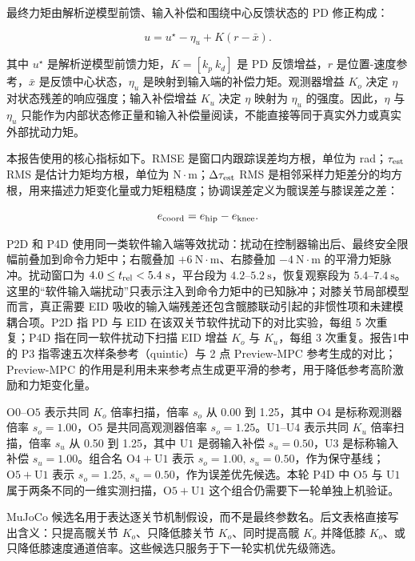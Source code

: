 最终力矩由解析逆模型前馈、输入补偿和围绕中心反馈状态的 PD 修正构成：

\[
u=u^\star-\eta_u+K(r-\bar{x}) .
\]

其中 \(u^\star\) 是解析逆模型前馈力矩，\(K=[k_p\ k_d]\) 是 PD 反馈增益，\(r\) 是位置-速度参考，\(\bar{x}\) 是反馈中心状态，\(\eta_u\) 是映射到输入端的补偿力矩。观测器增益 \(K_o\) 决定 \(\eta\) 对状态残差的响应强度；输入补偿增益 \(K_u\) 决定 \(\eta\) 映射为 \(\eta_u\) 的强度。因此，\(\eta\) 与 \(\eta_u\) 只能作为内部状态修正量和输入补偿量阅读，不能直接等同于真实外力或真实外部扰动力矩。

本报告使用的核心指标如下。RMSE 是窗口内跟踪误差均方根，单位为 rad；\(\tau_{\rm est}\) RMS 是估计力矩均方根，单位为 \(\mathrm{N\cdot m}\)；\(\Delta\tau_{\rm est}\) RMS 是相邻采样力矩差分的均方根，用来描述力矩变化量或力矩粗糙度；协调误差定义为髋误差与膝误差之差：

\[
e_{\rm coord}=e_{\rm hip}-e_{\rm knee}.
\]

P2D 和 P4D 使用同一类软件输入端等效扰动：扰动在控制器输出后、最终安全限幅前叠加到命令力矩中；右髋叠加 \(+6\ \mathrm{N\cdot m}\)、右膝叠加 \(-4\ \mathrm{N\cdot m}\) 的平滑力矩脉冲。扰动窗口为 \(4.0\le t_{\rm rel}<5.4\ \mathrm{s}\)，平台段为 \(4.2\)--\(5.2\ \mathrm{s}\)，恢复观察段为 \(5.4\)--\(7.4\ \mathrm{s}\)。这里的``软件输入端扰动''只表示注入到命令力矩中的已知脉冲；对膝关节局部模型而言，真正需要 EID 吸收的输入端残差还包含髋膝联动引起的非惯性项和未建模耦合项。P2D 指 PD 与 EID 在该双关节软件扰动下的对比实验，每组 5 次重复；P4D 指在同一软件扰动下扫描 EID 增益 \(K_o\) 与 \(K_u\)，每组 3 次重复。报告1中的 P3 指零速五次样条参考（quintic）与 2 点 Preview-MPC 参考生成的对比；Preview-MPC 的作用是利用未来参考点生成更平滑的参考，用于降低参考高阶激励和力矩变化量。

\(\mathrm{O0}\)--\(\mathrm{O5}\) 表示共同 \(K_o\) 倍率扫描，倍率 \(s_o\) 从 0.00 到 1.25，其中 \(\mathrm{O4}\) 是标称观测器倍率 \(s_o=1.00\)，\(\mathrm{O5}\) 是共同高观测器倍率 \(s_o=1.25\)。\(\mathrm{U1}\)--\(\mathrm{U4}\) 表示共同 \(K_u\) 倍率扫描，倍率 \(s_u\) 从 0.50 到 1.25，其中 \(\mathrm{U1}\) 是弱输入补偿 \(s_u=0.50\)，\(\mathrm{U3}\) 是标称输入补偿 \(s_u=1.00\)。组合名 \(\mathrm{O4+U1}\) 表示 \(s_o=1.00,\,s_u=0.50\)，作为保守基线；\(\mathrm{O5+U1}\) 表示 \(s_o=1.25,\,s_u=0.50\)，作为误差优先候选。本轮 P4D 中 \(\mathrm{O5}\) 与 \(\mathrm{U1}\) 属于两条不同的一维实测扫描，\(\mathrm{O5+U1}\) 这个组合仍需要下一轮单独上机验证。

MuJoCo 候选名用于表达逐关节机制假设，而不是最终参数名。后文表格直接写出含义：只提高髋关节 \(K_o\)、只降低膝关节 \(K_o\)、同时提高髋 \(K_o\) 并降低膝 \(K_o\)、或只降低膝速度通道倍率。这些候选只服务于下一轮实机优先级筛选。

